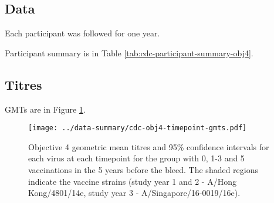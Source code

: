 \documentclass[12pt]{article}
\begin{document}
\subsection{Data}

Each participant was followed for one year.

Participant summary is in Table \ref{tab:cdc-participant-summary-obj4}.



\subsection{Titres}

GMTs are in Figure \ref{fig:cdc-obj4-timepoint-gmts}.

\begin{figure}
	\texttt{[image: ../data-summary/cdc-obj4-timepoint-gmts.pdf]}
	\caption{Objective 4 geometric mean titres and 95\% confidence intervals for each virus at each timepoint for the group with 0, 1-3 and 5 vaccinations in the 5 years before the bleed. The shaded regions indicate the vaccine strains (study year 1 and 2 - A/Hong Kong/4801/14e, study year 3 - A/Singapore/16-0019/16e).}
	\label{fig:cdc-obj4-timepoint-gmts}
\end{figure}
\end{document}
